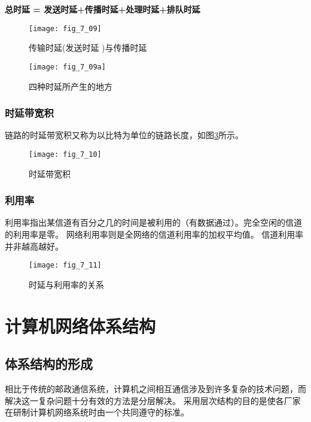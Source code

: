\textbf{总时延 = 发送时延+传播时延+处理时延+排队时延}

\begin{figure}
  \centering
  \texttt{[image: fig\_7\_09]}
  \caption{传输时延(发送时延 )与传播时延}\label{fig_7_09}
\end{figure}

\begin{figure}
  \centering
  \texttt{[image: fig\_7\_09a]}
  \caption{四种时延所产生的地方}\label{fig_7_09a}
\end{figure}


\subsubsection{时延带宽积}

链路的时延带宽积又称为以比特为单位的链路长度，如图\ref{fig_7_10}所示。
\begin{figure}
  \centering
  \texttt{[image: fig\_7\_10]}
  \caption{时延带宽积}\label{fig_7_10}
\end{figure}

\subsubsection{利用率}
利用率指出某信道有百分之几的时间是被利用的（有数据通过）。完全空闲的信道的利用率是零。
网络利用率则是全网络的信道利用率的加权平均值。
信道利用率并非越高越好。
\begin{figure}
  \centering
  \texttt{[image: fig\_7\_11]}
  \caption{时延与利用率的关系}\label{fig_7_11}
\end{figure}



\section{计算机网络体系结构}


\subsection{体系结构的形成}


相比于传统的邮政通信系统，计算机之间相互通信涉及到许多复杂的技术问题，而解决这一复杂问题十分有效的方法是分层解决。
采用层次结构的目的是使各厂家在研制计算机网络系统时由一个共同遵守的标准。


